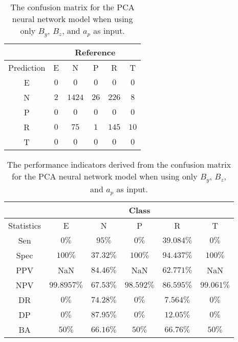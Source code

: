 \begin{table}[!ht]
	\centering
	\begin{tabular}{|c|c|c|c|c|c|}
		\hline
		 & \multicolumn{5}{|c|}{Reference} \\ \hline
		 Prediction & E & N & P & R & T \\ \hline
		 E & $0$ & $0$ & $0$ & $0$ & $0$ \\ \hline
		 N & $2$ & $1424$ & $26$ & $226$ & $8$ \\ \hline
		 P & $0$ & $0$ & $0$ & $0$ & $0$ \\ \hline
		 R & $0$ & $75$ & $1$ & $145$ & $10$ \\ \hline
		 T & $0$ & $0$ & $0$ & $0$ & $0$ \\ \hline
	\end{tabular}
	\caption{The confusion matrix for the PCA neural network model when using only $B_{y}$, $B_{z}$, and $a_{p}$ as input.}
	\label{tab:cm:yzap:pcaNNet}
\end{table}

\begin{table}[!ht]
	\centering
	\begin{tabular}{|c|c|c|c|c|c|}
		\hline
		 & \multicolumn{5}{c|}{Class} \\ \hline
		Statistics & E & N & P & R & T \\ \hline
		Sen & $0\%$ & $95\%$ & $0\%$ & $39.084\%$ & $0\%$ \\ \hline
		Spec & $100\%$ & $37.32\%$ & $100\%$ & $94.437\%$ & $100\%$ \\ \hline
		PPV & NaN & $84.46\%$ & NaN & $62.771\%$ & NaN \\ \hline
		NPV & $99.8957\%$ & $67.53\%$ & $98.592\%$ & $86.595\%$ & $99.061\%$ \\ \hline
		DR & $0\%$ & $74.28\%$ & $0\%$ & $7.564\%$ & $0\%$ \\ \hline
		DP & $0\%$ & $87.95\%$ & $0\%$ & $12.05\%$ & $0\%$ \\ \hline
		BA & $50\%$ & $66.16\%$ & $50\%$ & $66.76\%$ & $50\%$ \\ \hline
	\end{tabular}
	\caption{The performance indicators derived from the confusion matrix for the PCA neural network model when using only $B_{y}$, $B_{z}$, and $a_{p}$ as input.}
	\label{tab:cs:reverse:yzap:pcaNNet}
\end{table}

